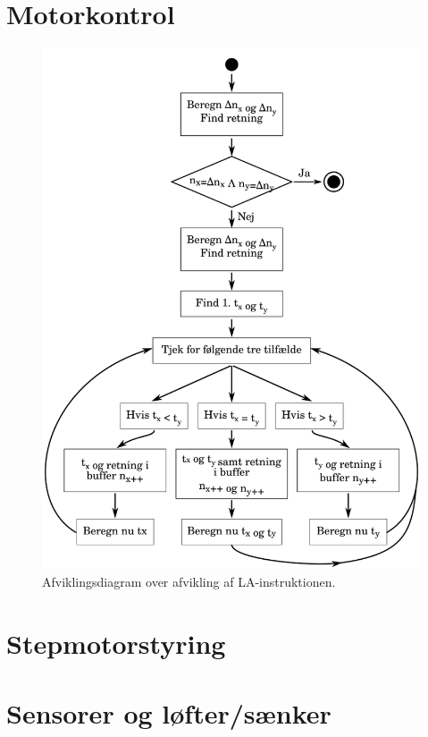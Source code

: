 \section[Motorkontrol (med buffer)]{Motorkontrol}




\begin{figure}[htbp]
  \centering
  \includegraphics[width=.75\textwidth]{./img/la-behandling}
  \caption{Afviklingsdiagram over afvikling af LA-instruktionen.}
  \label{fig:la-behandling}
\end{figure}


\section{Stepmotorstyring}



\section{Sensorer og løfter/sænker}


